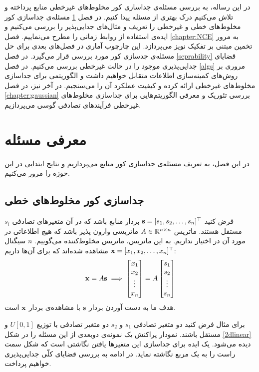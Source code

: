 \documentclass[oneside]{thesis}
\begin{document}
در این رساله، به بررسی مسئله‌ی جداسازی کور مخلوط‌های غیرخطی منابع پرداخته و تلاش می‌کنیم درک بهتری از مسئله پیدا کنیم. در فصل 
\ref{probdef}
مسئله‌ی جداسازی کور مخلوط‌های خطی و  غیرخطی را تعریف  و مثال‌های جدایی‌پذیر را بررسی می‌کنیم و ایده‌ی استفاده از روابط زمانی را مطرح می‌نماییم. فصل 
\ref{chapter:NCE}
به مرور تخمین مبتنی بر تفکیک نویز می‌پردازد. این چارچوب آماری در فصل‌های بعدی برای حل مسئله‌ی جدسازی کور مورد بررسی قرار می‌گیرد.  در فصل 
\ref{seprability}
قضایای جدایی‌پذیری موجود را در حالت غیرخطی بررسی می‌کنیم. در  فصل
\ref{algs}
مروری بر روش‌های کمینه‌سازی اطلاعات متقابل خواهیم داشت و الگوریتمی برای جداسازی مخلوط‌های غیرخطی ارائه کرده و کیفیت عملکرد آن را می‌سنجیم.  در آخر نیز، در فصل
\ref{chapter:gaussian}
بررسی تئوریک و معرفی الگوریتم‌هایی برای جداسازی مخلوط‌های غیرخطی فرآیندهای تصادفی گوسی می‌پردازیم.
\chapter{معرفی مسئله}
\label{probdef}
در این فصل، به تعریف مسئله‌ی جداسازی کور منابع می‌پردازیم و نتایج ابتدایی در این حوزه را مرور می‌کنیم.

\section{جداسازی کور مخلوط‌های خطی}
فرض کنید 
$\mathbf{s} = [s_1, s_2, \dots, s_n]^\top$
بردار منابع باشد که در آن متغیر‌های تصادفی 
$s_i$
مستقل هستند. ماتریس
$A \in \mathbb{R}^{n\times n}$
ماتریسی وارون پذیر باشد که هیچ اطلاعاتی در مورد آن در اختیار نداریم. به این ماتریس، ماتریس مخلوط‌کننده می‌گوییم. $n$ سیگنال 
$\mathbf{x} = [x_1, x_2, \dots, x_n]^\top$
مشاهده شده‌اند که برای آن‌ها داریم:
\begin{equation}
\mathbf{x} = A\mathbf{s} \implies 
\begin{bmatrix}
x_1\\x_2\\\vdots\\x_n
\end{bmatrix} = 
A
\begin{bmatrix}
s_1\\s_2\\\vdots\\s_n
\end{bmatrix}
\end{equation}
هدف ما به دست آوردن بردار 
$\mathbf{s}$
با مشاهده‌ی بردار
$\mathbf{x}$
است. 

برای مثال فرض کنید دو متغیر‌ تصادفی
$s_1$
و 
$s_2$
دو متغیر تصادفی با توزیع
$U[0, 1]$
و مستقل باشند. نمودار پراکنش یک نمونه‌ی دوبعدی از این مسئله‌ را در شکل
\eqref{2dlinear}
دیده می‌شود. یک ایده‌ برای جداسازی این متغیرها یافتن نگاشتی است که شکل سمت راست را به یک مربع نگاشته نماید. در ادامه به بررسی قضایای کلّی جدایی‌پذیری خواهیم پرداخت.
\end{document}
